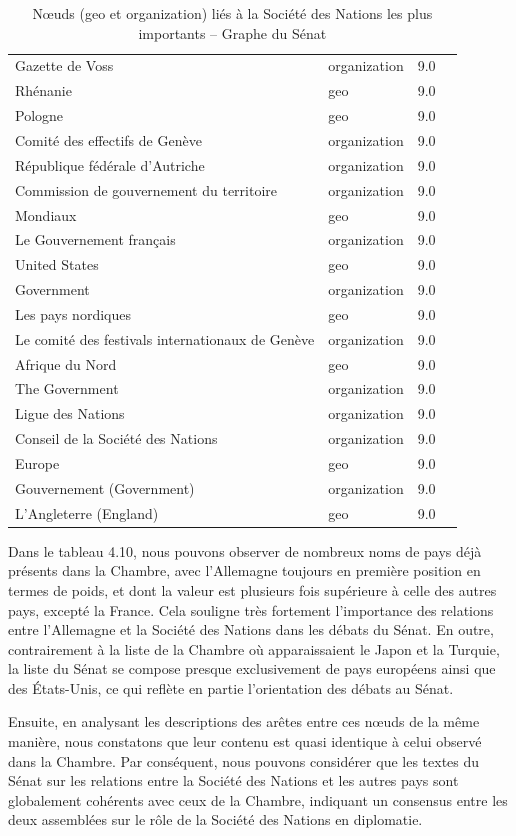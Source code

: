 \documentclass[a4paper,twoside,12pt]{book}
\begin{document}
\begin{table}[htbp]
\begin{tabular}{ll@{\hskip 1cm}ll}
Gazette de Voss & organization & 9.0 \\
Rhénanie & geo & 9.0 \\
Pologne & geo & 9.0 \\
Comité des effectifs de Genève & organization & 9.0 \\
République fédérale d'Autriche & organization & 9.0 \\
Commission de gouvernement du territoire & organization & 9.0 \\
Mondiaux & geo & 9.0 \\
Le Gouvernement français & organization & 9.0 \\
United States & geo & 9.0 \\
Government & organization & 9.0 \\
Les pays nordiques & geo & 9.0 \\
Le comité des festivals internationaux de Genève & organization & 9.0 \\
Afrique du Nord & geo & 9.0 \\
The Government & organization & 9.0 \\
Ligue des Nations & organization & 9.0 \\
Conseil de la Société des Nations & organization & 9.0 \\
Europe  & geo & 9.0 \\
Gouvernement (Government) & organization & 9.0 \\
L'Angleterre (England) & geo & 9.0 \\
\hline
\end{tabular}
\caption{Nœuds (geo et organization) liés à la Société des Nations les plus importants – Graphe du Sénat}
\end{table}

Dans le tableau 4.10, nous pouvons observer de nombreux noms de pays déjà présents dans la Chambre, avec l'Allemagne toujours en première position en termes de poids, et dont la valeur est plusieurs fois supérieure à celle des autres pays, excepté la France. Cela souligne très fortement l'importance des relations entre l'Allemagne et la Société des Nations dans les débats du Sénat. En outre, contrairement à la liste de la Chambre où apparaissaient le Japon et la Turquie, la liste du Sénat se compose presque exclusivement de pays européens ainsi que des États-Unis, ce qui reflète en partie l'orientation des débats au Sénat. 

Ensuite, en analysant les descriptions des arêtes entre ces nœuds de la même manière, nous constatons que leur contenu est quasi identique à celui observé dans la Chambre. Par conséquent, nous pouvons considérer que les textes du Sénat sur les relations entre la Société des Nations et les autres pays sont globalement cohérents avec ceux de la Chambre, indiquant un consensus entre les deux assemblées sur le rôle de la Société des Nations en diplomatie.
\end{document}
